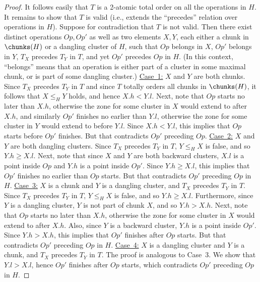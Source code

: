 \begin{lemma}
\begin{proof}
It follows easily that $T$ is a 2-atomic total order on all the operations in $H$.
It remains to show that $T$ is valid (i.e., extends the ``precedes'' relation over operations in $H$).
Suppose for contradiction that $T$ is not valid.
Then there exist distinct operations $Op,Op'$ as well as two elements $X,Y$,
each either a chunk in $\chunks(H)$ or a dangling cluster of $H$,
such that $Op$ belongs in $X$, $Op'$ belongs in $Y$,
$T_X$ precedes $T_Y$ in $T$, and yet $Op'$ precedes $Op$ in $H$.
(In this context, ``belongs'' means that an operation is either part of a cluster in some maximal chunk,
or is part of some dangling cluster.)
\newline\underline{Case~1:} $X$ and $Y$ are both chunks.
Since $T_X$ precedes $T_Y$ in $T$ and since $T$ totally orders all chunks in $\chunks(H)$,
it follows that $X \leq_H Y$ holds, and hence $X.h < Y.l$.
Next, note that $Op$ starts no later than $X.h$, otherwise the zone for some cluster in $X$ would extend to after $X.h$,
and similarly $Op'$ finishes no earlier than $Y.l$, otherwise the zone for some cluster in $Y$ would extend to before $Y.l$.
Since $X.h < Y.l$, this implies that $Op$ starts before $Op'$ finishes.
But that contradicts $Op'$ preceding $Op$.
\newline\underline{Case~2:} $X$ and $Y$ are both dangling clusters.
Since $T_X$ precedes $T_Y$ in $T$, $Y \leq_H X$ is false, and so $Y.h \geq X.l$.
Next, note that since $X$ and $Y$ are both backward clusters,
$X.l$ is a point inside $Op$ and $Y.h$ is a point inside $Op'$.
Since $Y.h \geq X.l$, this implies that $Op'$ finishes no earlier than $Op$ starts.
But that contradicts $Op'$ preceding $Op$ in $H$.
\newline\underline{Case~3:} $X$ is a chunk and $Y$ is a dangling cluster, and $T_X$ precedes $T_Y$ in $T$.
Since $T_X$ precedes $T_Y$ in $T$, $Y \leq_H X$ is false, and so $Y.h \geq X.l$.
Furthermore, since $Y$ is a dangling cluster, $Y$ is not part of chunk $X$, and so $Y.h > X.h$.
Next, note that $Op$ starts no later than $X.h$, otherwise the zone for some cluster in $X$ would extend to after $X.h$.
Also, since $Y$ is a backward cluster, $Y.h$ is a point inside $Op'$.
Since $Y.h > X.h$, this implies that $Op'$ finishes after $Op$ starts.
But that contradicts $Op'$ preceding $Op$ in $H$.
\newline\underline{Case~4:} $X$ is a dangling cluster and $Y$ is a chunk, and $T_X$ precedes $T_Y$ in $T$.
The proof is analogous to Case~3.
We show that $Y.l > X.l$, hence $Op'$ finishes after $Op$ starts, which contradicts $Op'$ preceding $Op$ in $H$.
\end{proof}
\end{lemma}

